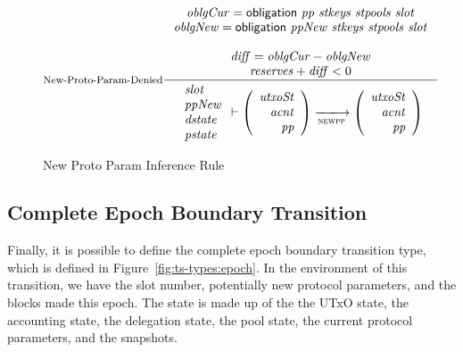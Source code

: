 \begin{figure}[htb]
  \nextdef

  \begin{equation}\label{eq:new-pc-denied}
    \inference[New-Proto-Param-Denied]
    {
      \var{oblgCur} = \obligation{pp}{stkeys}{stpools}{slot} \\
      \var{oblgNew} = \obligation{ppNew}{stkeys}{stpools}{slot} \\
      ~\\
      \var{diff} = \var{oblgCur} - \var{oblgNew} \\
      \var{reserves} + \var{diff} < 0\\
    }
    {
      \begin{array}{l}
        \var{slot}\\
        \var{ppNew}\\
        \var{dstate}\\
        \var{pstate}\\
      \end{array}
      \vdash
      \left(
        \begin{array}{r}
          \var{utxoSt} \\
          \var{acnt} \\
          \var{pp}
        \end{array}
      \right)
      \trans{newpp}{}
      \left(
        \begin{array}{rcl}
          \var{utxoSt} \\
          \var{acnt} \\
          \var{pp}
        \end{array}
      \right)
    }
  \end{equation}
  \caption{New Proto Param Inference Rule}
  \label{fig:rules:new-proto-param}
\end{figure}

\clearpage

\subsection{Complete Epoch Boundary Transition}
\label{sec:total-epoch}

Finally, it is possible to define the complete epoch boundary transition type,
which is defined in Figure~\ref{fig:ts-types:epoch}.
In the environment of this transition, we have the slot number, potentially new
protocol parameters, and the blocks made this epoch.  The state is made up of the
the UTxO state, the accounting state, the delegation state, the pool state,
the current protocol parameters, and the snapshots.

